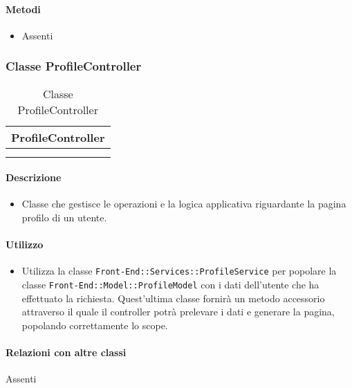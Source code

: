 \paragraph*{Metodi}
\begin{itemize}
\item[] Assenti
\end{itemize}

\subsubsection{Classe ProfileController}

\begin{table}[ht]
\begin{center}
\bgroup
\setlength{\arrayrulewidth}{0.6mm}
\def\arraystretch{1}
\begin{tabular}{ | p{12cm} | }
\hline
\centerline{\textbf{ProfileController}}
\\ \hline
 \\ 
\hline
 \\ 
\hline
\end{tabular}
\egroup
\caption{Classe ProfileController}
\end{center}
\end{table}

\paragraph*{Descrizione}
\begin{itemize}
\item[] Classe che gestisce le operazioni e la logica applicativa riguardante la pagina profilo di un utente.
\end{itemize}

\paragraph*{Utilizzo}
\begin{itemize}
\item[] Utilizza la classe \texttt{Front-End::Services::ProfileService} per popolare la classe \texttt{Front-End::Model::ProfileModel} con i dati dell'utente che ha effettuato la richiesta. Quest'ultima classe fornirà un metodo accessorio attraverso il quale il controller potrà prelevare i dati e generare la pagina, popolando correttamente lo scope.
\end{itemize}

\paragraph*{Relazioni con altre classi}
Assenti

